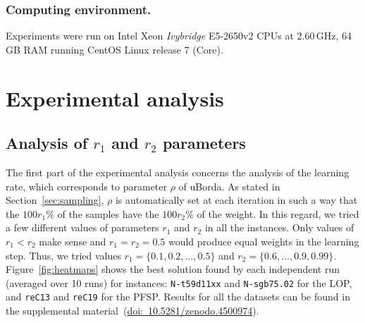 \documentclass[sigconf,dvipsnames]{acmart}
\newcommand{\supplement}{\href{http://doi.org/10.5281/zenodo.4500974}{doi:~10.5281/zenodo.4500974}}
\begin{document}

\subsubsection{Computing environment.}
Experiments were run on Intel Xeon \emph{Ivybridge} E5-2650v2 CPUs at
2.60\,GHz, 64\,GB RAM running CentOS Linux release 7 (Core).

\section{Experimental analysis}\label{sec:analysis}

\subsection{Analysis of $r_1$ and $r_2$ parameters}

The first part of the experimental analysis concerns the analysis of the learning rate, which corresponds to parameter $\rho$ of uBorda. As stated in Section~\ref{sec:sampling}, $\rho$ is automatically set at each iteration in such a way that the $100r_1\%$ of the samples have the $100r_2\%$ of the weight. In this regard, we tried a few different values of parameters $r_1$ and $r_2$ in all the instances. Only values of $r_1 < r_2$ make sense and $r_1 = r_2 = 0.5$ would produce equal weights in the learning step. Thus, we tried values $r_1 = \{0.1, 0.2, \dotsc, 0.5\}$ and $r_2 = \{0.6,\dotsc, 0.9, 0.99\}$. Figure~\ref{fig:heatmaps} shows the best solution found by each independent run (averaged over 10 runs) for instances: \texttt{N-t59d11xx} and \texttt{N-sgb75.02} for the LOP, and \texttt{reC13} and \texttt{reC19} for the PFSP. Results for all the datasets can be found in the supplemental material~(\supplement).
\end{document}
